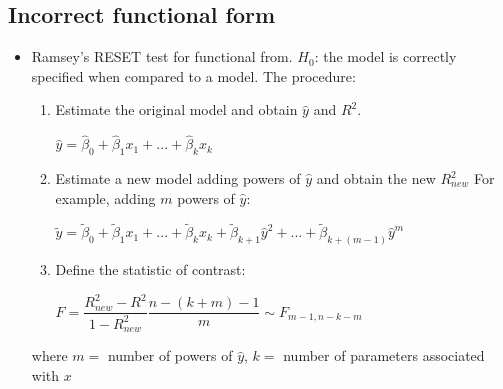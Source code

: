 \documentclass[10pt, a4paper, landscape]{extarticle}
\begin{document}
\begin{multicols}{3}
\section*{Incorrect functional form}
	\begin{itemize}[leftmargin=*]
		\item Ramsey's RESET test for functional from. $H_0$: the model is correctly specified when compared to a model. The procedure:
		\begin{enumerate}[leftmargin=*]
			\item Estimate the original model and obtain $\hat{y}$ and $R^2$.
			\begin{center}
				$\hat{y} = \hat{\beta}_0 + \hat{\beta}_1 x_1 + ... + \hat{\beta}_k x_k$
			\end{center}
			\item Estimate a new model adding powers of $\hat{y}$ and obtain the new $R^2_{new}$ For example, adding $m$ powers of $\hat{y}$:
			\begin{center}
				$\tilde{y} = \tilde{\beta}_0 + \tilde{\beta}_1 x_1 + ... + \tilde{\beta}_k x_k + \tilde{\beta}_{k+1} \hat{y}^2 + ... + \tilde{\beta}_{k+(m-1)} \hat{y}^m$
			\end{center}
			\item Define the statistic of contrast:
			\begin{center}
				$F = \dfrac{R^2_{new} - R^2}{1 - R^2_{new}} \dfrac{n -(k + m) - 1}{m} \sim F_{m-1, n-k-m}$
			\end{center}
		\end{enumerate} %
	where $m =$ number of powers of $\hat{y}$, $k =$ number of parameters associated with $x$
	\end{itemize}


\end{multicols}
\end{document}
